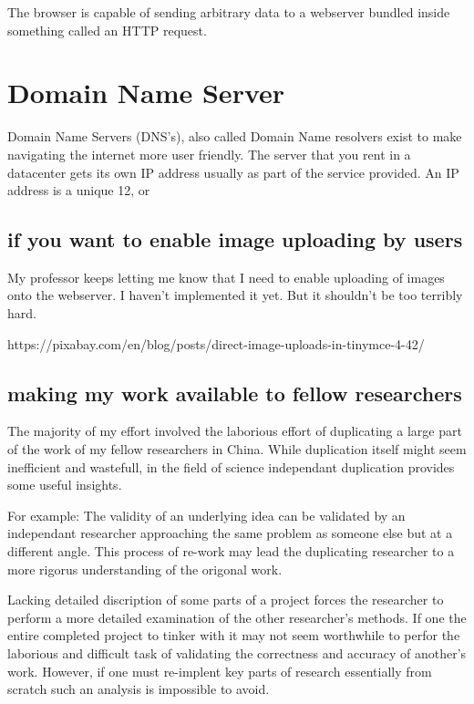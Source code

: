 The browser is capable of sending arbitrary data to a webserver bundled inside something called an HTTP request.

\section{Domain Name Server}

Domain Name Servers (DNS's), also called Domain Name resolvers exist to make navigating the internet more user friendly.  The server that you rent in a datacenter gets its own IP address usually as part of the service provided.  An IP address is a unique 12, or 

\subsection{if you want to enable image uploading by users}

My professor keeps letting me know that I need to enable uploading of images onto the webserver.  I haven't implemented it yet.  But it shouldn't be too terribly hard.

https://pixabay.com/en/blog/posts/direct-image-uploads-in-tinymce-4-42/

\subsection{making my work available to fellow researchers}

The majority of my effort involved the laborious effort of duplicating a large part of the work of my fellow researchers in China.  While duplication itself might seem inefficient and wastefull, in the field of science independant duplication provides some useful insights.

For example:  The validity of an underlying idea can be validated by an independant researcher approaching the same problem as someone else but at a different angle.  This process of re-work may lead the duplicating researcher to a more rigorus understanding of the origonal work.

Lacking detailed discription of some parts of a project forces the researcher to perform a more detailed examination of the other researcher's methods.  If one the entire completed project to tinker with it may not seem worthwhile to perfor the laborious and difficult task of validating the correctness and accuracy of another's work.  However, if one must re-implent key parts of research essentially from scratch such an analysis is impossible to avoid.

